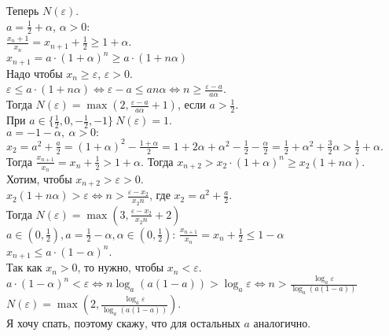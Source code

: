 \documentclass[a4paper]{article}
\def\eps{\varepsilon}
\begin{document}
\begin{enumerate}
    Теперь $N(\eps)$.\\ 
    $a = \frac{1}{2} + \alpha$, $\alpha > 0$:\\
    $\frac{x_n+1}{x_n} = x_{n+1} + \frac{1}{2} \ge 1 + \alpha$.\\
    $x_{n+1} = a\cdot (1+\alpha)^n \ge a\cdot(1 + n\alpha)$\\
    Надо чтобы $x_{n} \ge \eps$, $\eps > 0$.\\
    $\eps \le a\cdot(1 + n\alpha) \Leftrightarrow \eps - a \le an\alpha \Leftrightarrow n \ge \frac{\eps - a}{a\alpha}$.\\
    Тогда $N(\eps) = \max(2, \frac{\eps - a}{a\alpha} + 1)$, если $a > \frac{1}{2}$.\\
    При $a \in \{\frac{1}{2}, 0, -\frac{1}{2}, -1\}\ N(\eps) = 1$.\\
    $a = -1 - \alpha,\ \alpha > 0:$\\
    $x_{2} = a^2 + \frac{a}{2} = (1+\alpha)^2 - \frac{1+\alpha}{2} = 1 + 2\alpha + \alpha^2 - \frac{1}{2} - \frac{\alpha}{2} = \frac{1}{2} + \alpha^2 + \frac{3}{2}\alpha > \frac{1}{2} + \alpha$. Тогда $\frac{x_{n+1}}{x_n} = x_n + \frac{1}{2} > 1 + \alpha$. Тогда $x_{n+2} > x_2\cdot(1 + \alpha)^{n} \ge x_2(1 + n\alpha)$.\\
    Хотим, чтобы $x_{n+2} > \eps > 0.$\\
    $x_2(1+n\alpha) > \eps \Leftrightarrow n > \frac{\eps - x_2}{x_2n}$, где $x_2 = a^2 + \frac{a}{2}$.\\
    Тогда $N(\eps) = \max(3, \frac{\eps - x_2}{x_2n} + 2)$\\
    $a \in (0, \frac{1}{2}), a = \frac{1}{2} - \alpha, \alpha \in (0, \frac{1}{2})$:
    $\frac{x_{n+1}}{x_n} = x_n + \frac{1}{2} \le 1 - \alpha$\\
    $x_{n+1} \le a\cdot(1 - \alpha)^n$.\\
    Так как $x_n > 0$, то нужно, чтобы $x_n < \eps$.\\
    $a\cdot(1-\alpha)^n < \eps \Leftrightarrow n\log_a(a(1-a)) > \log_a\eps \Leftrightarrow n > \frac{\log_a\eps}{\log_a(a(1-a))}$\\
    $N(\eps) = \max(2, \frac{\log_a\eps}{\log_a(a(1-a))})$.\\
    Я хочу спать, поэтому скажу, что для остальных $a$ аналогично.


\end{enumerate}
\end{document}
